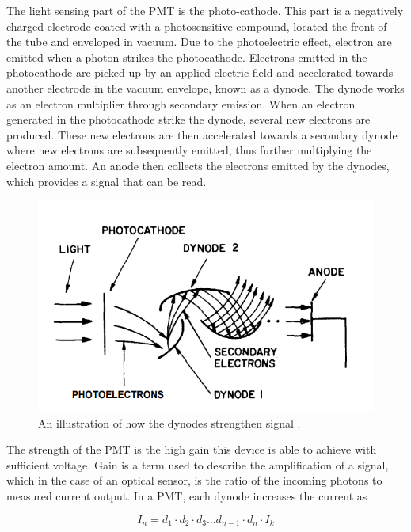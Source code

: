 The light sensing part of the PMT is the photo-cathode. This part is a negatively charged electrode coated with a photosensitive compound, located  the front of the tube and enveloped in vacuum. Due to the photoelectric effect, electron are emitted when a photon strikes the photocathode. Electrons emitted in the photocathode are picked up by an applied electric field and accelerated towards another electrode in the vacuum envelope, known as a dynode. The dynode works as an electron multiplier through secondary emission. When an electron generated in the photocathode strike the dynode, several new electrons are produced. These new electrons are then accelerated towards a secondary dynode where new electrons are subsequently emitted, thus further multiplying the electron amount. An anode then collects the electrons emitted by the dynodes, which provides a signal that can be read.

\begin{figure}[htb]
\begin{center}
\includegraphics[scale=0.6]{figures/RCS/PMT}
\caption{An illustration of how the dynodes strengthen signal \cite{Dynode}.}
\label{fig:PMT_dynode}
\end{center}
\end{figure}

The strength of the PMT is the high gain this device is able to achieve with sufficient voltage. Gain is a term used to describe the amplification of a signal, which in the case of an optical sensor, is the ratio of the incoming photons to measured current output. In a PMT, each dynode increases the current as

\begin{equation}
    I_n = d_1 \cdot d_2 \cdot d_3 ... d_{n-1} \cdot d_n \cdot I_k
\end{equation}

